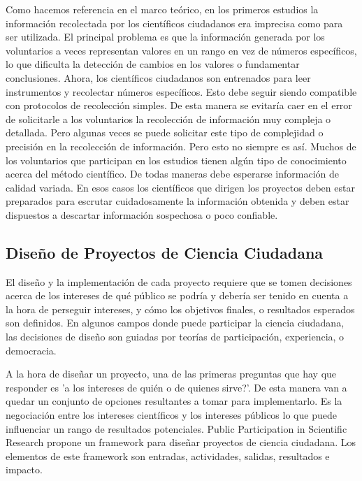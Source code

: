 	Como hacemos referencia en el marco teórico, en los primeros estudios la información recolectada por los científicos ciudadanos era imprecisa como para ser utilizada. El principal problema es que la información generada por los voluntarios a veces representan valores en un rango en vez de números específicos, lo que dificulta la detección de cambios en los valores o fundamentar conclusiones. Ahora, los científicos ciudadanos son entrenados para leer instrumentos y recolectar números específicos. Esto debe seguir siendo compatible con protocolos de recolección simples. De esta manera se evitaría caer en el error de solicitarle a los voluntarios la recolección de información muy compleja o detallada. Pero algunas veces se puede solicitar este tipo de complejidad o precisión en la recolección de información. Pero esto no siempre es así. Muchos de los voluntarios que participan en los estudios tienen algún tipo de conocimiento acerca del método científico. De todas maneras debe esperarse información de calidad variada. En esos casos los científicos que dirigen los proyectos deben estar preparados para escrutar cuidadosamente la información obtenida y deben estar dispuestos a descartar información sospechosa o poco confiable.\cite{cohn2008citizen} 
		
\subsection{Diseño de Proyectos de Ciencia Ciudadana}

	El diseño y la implementación de cada proyecto requiere que se tomen decisiones acerca de los intereses de qué público se podría y  debería ser tenido en cuenta a la hora de perseguir intereses, y cómo los objetivos finales, o resultados esperados son definidos. En algunos campos donde puede participar la ciencia ciudadana, las decisiones de diseño son guiadas por teorías de participación, experiencia, o democracia.
	
	A la hora de diseñar un proyecto, una de las primeras preguntas que hay que responder es 'a los intereses de quién o de quienes sirve?'. De esta manera van a quedar un conjunto de opciones resultantes a tomar para implementarlo. Es la negociación entre los intereses científicos y los intereses públicos lo que puede influenciar un rango de resultados potenciales. Public Participation in Scientific Research \cite{shirk2012public} propone un framework para diseñar proyectos de ciencia ciudadana. Los elementos de este framework  son entradas, actividades, salidas, resultados e impacto. 
	
